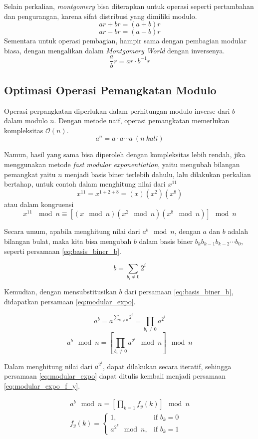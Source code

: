 Selain perkalian, \textit{montgomery} bisa diterapkan untuk operasi seperti pertambahan dan pengurangan, karena sifat distribusi yang dimiliki modulo.
$$ ar + br = (a+b)r $$
$$ ar - br = (a-b)r $$
Sementara untuk operasi pembagian, hampir sama dengan pembagian modular biasa, dengan mengalikan dalam \textit{Montgomery World} dengan inversenya.
$$ \frac{a}{b}r = ar \cdot b^{-1}r $$

\subsection{ Optimasi Operasi Pemangkatan Modulo}
Operasi perpangkatan diperlukan dalam perhitungan modulo inverse dari $ b $ dalam modulo $ n $. Dengan metode naif, operasi pemangkatan memerlukan kompleksitas $ \mathcal{O}{(n)} $.
$$ a^n = a \cdot a \cdots a\ (n\ kali) $$

Namun, hasil yang sama bisa diperoleh dengan kompleksitas lebih rendah, jika menggunakan metode \textit{fast modular exponentiation}, yaitu mengubah bilangan pemangkat yaitu $ n $ menjadi basis biner terlebih dahulu, lalu dilakukan perkalian bertahap, untuk contoh dalam menghitung nilai dari $ x^{11} $
$$ x^{11} = x^{1+2+8} = (x)(x^{2})(x^{8}) $$
atau dalam kongruensi 
$$ x^{11}\ \mod{n} \equiv [(x\mod{n})(x^{2}\mod{n})(x^{8}\mod{n})]\mod{n} $$

Secara umum, apabila menghitung nilai dari $ a^b\mod{n} $, dengan $ a $ dan $ b $ adalah bilangan bulat, maka kita bisa mengubah $ b $ dalam basis biner $b_{k} b_{k-1} b_{k-2} \cdots b_{0}$, seperti persamaan \eqref{eq:basis_biner_b}.

\begin{equation}
	b = \sum_{b_i \neq 0} 2^i
	\label{eq:basis_biner_b}
\end{equation}

Kemudian, dengan mensubstitusikan $ b $ dari persamaan \eqref{eq:basis_biner_b}, didapatkan persamaan \eqref{eq:modular_expo}.

$$ a^b = a^{\sum_{b_i \neq 0} 2^i} = \prod_{b_i \neq 0} a^{2^{i}} $$
\begin{equation}
	a^b\mod{n} = \left [ \prod_{b_i \neq 0} a^{2^{i}} \mod{n} \right ] \mod{n}
	\label{eq:modular_expo}
\end{equation}

Dalam menghitung nilai dari $ a^{2^{i}} $, dapat dilakukan secara iteratif, sehingga persamaan \eqref{eq:modular_expo} dapat ditulis kembali menjadi persamaan \eqref{eq:modular_expo_f_y}.

\begin{equation}
	\begin{aligned}
	a^b\mod{n} = \left [ \prod_{k = 1} f_y(k)\right ] \mod{n} \\
	f_y(k)=
		\begin{cases}
			1,  					& \text{if } b_k=0 \\
			a^{2^{k}}  \mod{n} ,   & \text{if } b_k=1
		\end{cases} \\
	\end{aligned}
	\label{eq:modular_expo_f_y}
\end{equation}

